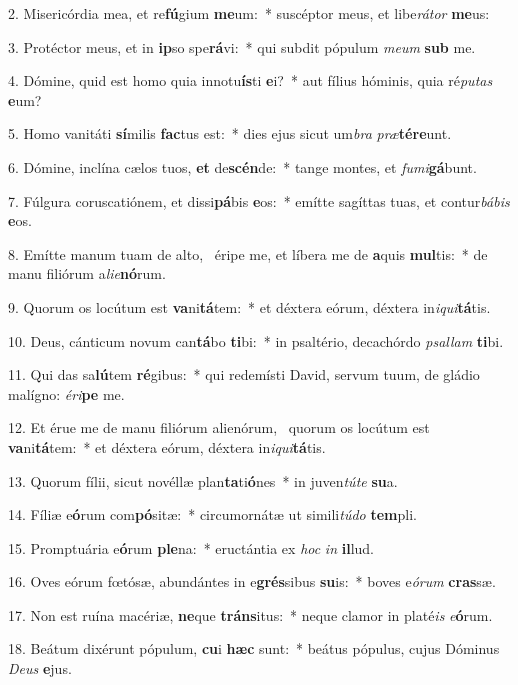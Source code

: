 2. Misericórdia mea, et re\textbf{fú}gium \textbf{me}um:~*  suscéptor meus, et libe\textit{rá}\textit{tor} \textbf{me}us:\

3. Protéctor meus, et in \textbf{ip}so spe\textbf{rá}vi:~*  qui subdit pópulum \textit{me}\textit{um} \textbf{sub} me.\

4. Dómine, quid est homo quia innotu\textbf{ís}ti \textbf{e}i?~*  aut fílius hóminis, quia ré\textit{pu}\textit{tas} \textbf{e}um?\

5. Homo vanitáti \textbf{sí}milis \textbf{fac}tus est:~*  dies ejus sicut um\textit{bra} \textit{præ}\textbf{tér}\textbf{e}unt.\

6. Dómine, inclína cælos tuos, \textbf{et} de\textbf{scén}de:~*  tange montes, et \textit{fu}\textit{mi}\textbf{gá}bunt.\

7. Fúlgura coruscatiónem, et dissi\textbf{pá}bis \textbf{e}os:~*  emítte sagíttas tuas, et contur\textit{bá}\textit{bis} \textbf{e}os.\

8. Emítte manum tuam de alto, \dag\  éripe me, et líbera me de \textbf{a}quis \textbf{mul}tis:~*  de manu filiórum a\textit{li}\textit{e}\textbf{nó}rum.\

9. Quorum os locútum est \textbf{va}ni\textbf{tá}tem:~*  et déxtera eórum, déxtera in\textit{i}\textit{qui}\textbf{tá}tis.\

10. Deus, cánticum novum can\textbf{tá}bo \textbf{ti}bi:~*  in psaltério, decachórdo \textit{psal}\textit{lam} \textbf{ti}bi.\

11. Qui das sa\textbf{lú}tem \textbf{ré}gibus:~*  qui redemísti David, servum tuum, de gládio malígno: \textit{é}\textit{ri}\textbf{pe} me.\

12. Et érue me de manu filiórum alienórum, \dag\  quorum os locútum est \textbf{va}ni\textbf{tá}tem:~*  et déxtera eórum, déxtera in\textit{i}\textit{qui}\textbf{tá}tis.\

13. Quorum fílii, sicut novéllæ plan\textbf{ta}ti\textbf{ó}nes~*  in juven\textit{tú}\textit{te} \textbf{su}a.\

14. Fíliæ e\textbf{ó}rum com\textbf{pó}sitæ:~*  circumornátæ ut simili\textit{tú}\textit{do} \textbf{tem}pli.\

15. Promptuária e\textbf{ó}rum \textbf{ple}na:~*  eructántia ex \textit{hoc} \textit{in} \textbf{il}lud.\

16. Oves eórum fœtósæ, abundántes in e\textbf{grés}sibus \textbf{su}is:~*  boves e\textit{ó}\textit{rum} \textbf{cras}sæ.\

17. Non est ruína macériæ, \textbf{ne}que \textbf{tráns}itus:~*  neque clamor in platé\textit{is} \textit{e}\textbf{ó}rum.\

18. Beátum dixérunt pópulum, \textbf{cu}i \textbf{hæc} sunt:~*  beátus pópulus, cujus Dóminus \textit{De}\textit{us} \textbf{e}jus.\

